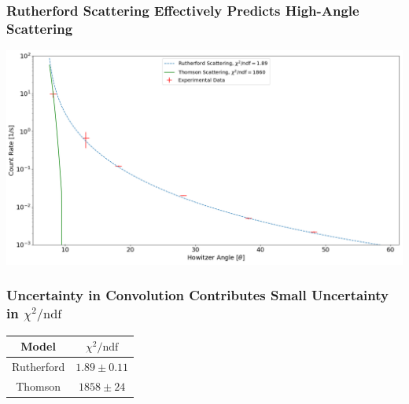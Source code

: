 \documentclass{beamer}
\begin{document}
\begin{frame}
  \frametitle{Rutherford Scattering Effectively Predicts High-Angle Scattering}
    \includegraphics[width=1.0\textwidth]{convolve.png}
\end{frame}

\begin{frame}
\frametitle{Uncertainty in Convolution Contributes Small Uncertainty in $\chi^2/\text{ndf}$}
  \begin{table}
    \begin{tabular}{cc}
    Model & $\chi^2/\text{ndf}$ \\
    \hline
    Rutherford & $1.89 \pm 0.11$ \\
    Thomson & $1858 \pm 24$ \\
  \end{tabular}
  \end{table}
\end{frame}
\end{document}
